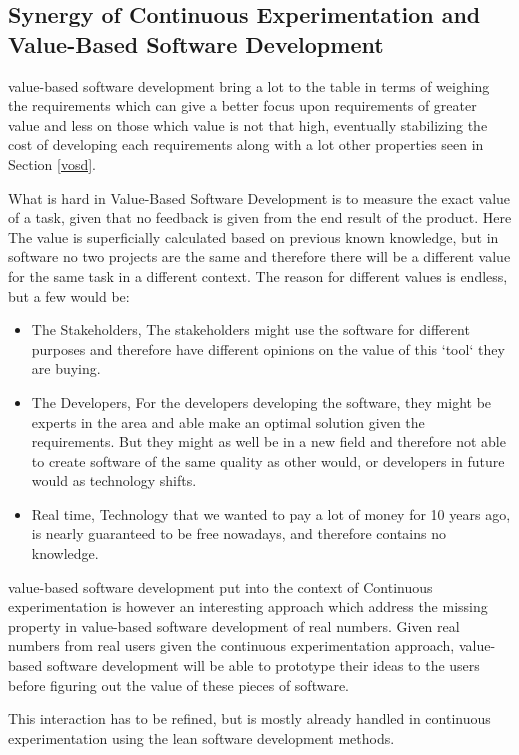 \documentclass{sig-alternate}
\begin{document}
\subsection{Synergy of Continuous Experimentation  and Value-Based Software Development}
\label{dis:synery}
value-based software development bring a lot to the table in terms of weighing the requirements 
which can give a better focus upon requirements of greater value and less on those which value is not
that high, eventually stabilizing the cost of developing each requirements along with a lot other properties 
seen in Section \ref{vosd}.

What is hard in Value-Based Software Development is to measure the exact value of a task, given that no
feedback is given from the end result of the product.
Here The value is superficially calculated based on previous known knowledge, but in software no two projects
are the same and therefore there will be a different value for the same task in a different context. 
The reason for different values is endless, but a few would be:
\begin{itemize}
\item The Stakeholders, The stakeholders might use the software for different purposes and therefore have
different opinions on the value of this `tool` they are buying.
\item The Developers, For the developers developing the software, they might be experts in the area and able
make an optimal solution given the requirements. But they might as well be in a new field and therefore 
not able to create software of the same quality as other would, or developers in future would as technology
shifts.
\item Real time, Technology that we wanted to pay a lot of money for 10 years ago, is nearly guaranteed to be 
free nowadays, and therefore contains no knowledge.
\end{itemize}

value-based software development put into the context of Continuous experimentation is however an 
interesting approach which address the missing property in value-based software development of 
real numbers.
Given real numbers from real users given the continuous experimentation approach, value-based software 
development will be able to prototype their ideas to the users before figuring out the value of these 
pieces of software.

This interaction has to be refined, but is mostly already handled in continuous experimentation using the 
lean software development methods. 
\end{document}
